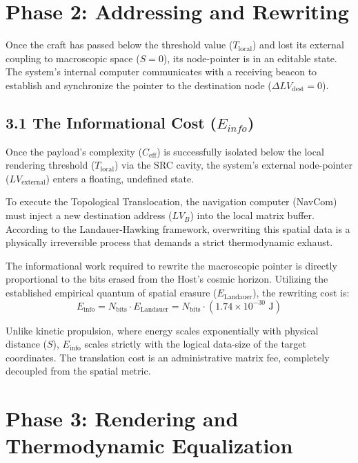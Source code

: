 \documentclass[12pt,a4paper]{article}
\begin{document}
\section{Phase 2: Addressing and Rewriting}

Once the craft has passed below the threshold value ($T_{\mathrm{local}}$) and lost its external coupling to macroscopic space ($S=0$), its node-pointer is in an editable state. The system's internal computer communicates with a receiving beacon to establish and synchronize the pointer to the destination node ($\Delta LV_{\text{dest}} = 0$).

\subsection{3.1 The Informational Cost ($E_{info}$)}
Once the payload's complexity ($C_{\mathrm{eff}}$) is successfully isolated below the local rendering threshold ($T_{\mathrm{local}}$) via the SRC cavity, the system's external node-pointer ($LV_{\mathrm{external}}$) enters a floating, undefined state.

To execute the Topological Translocation, the navigation computer (NavCom) must inject a new destination address ($LV_B$) into the local matrix buffer. According to the Landauer-Hawking framework, overwriting this spatial data is a physically irreversible process that demands a strict thermodynamic exhaust. 

The informational work required to rewrite the macroscopic pointer is directly proportional to the bits erased from the Host's cosmic horizon. Utilizing the established empirical quantum of spatial erasure ($E_{\mathrm{Landauer}}$), the rewriting cost is:
\begin{equation}
E_{\mathrm{info}} = N_{\mathrm{bits}} \cdot E_{\mathrm{Landauer}} = N_{\mathrm{bits}} \cdot \left( 1.74 \times 10^{-30} \text{ J} \right)
\end{equation}

Unlike kinetic propulsion, where energy scales exponentially with physical distance ($S$), $E_{\mathrm{info}}$ scales strictly with the logical data-size of the target coordinates. The translation cost is an administrative matrix fee, completely decoupled from the spatial metric.


\section{Phase 3: Rendering and Thermodynamic Equalization}
\end{document}
